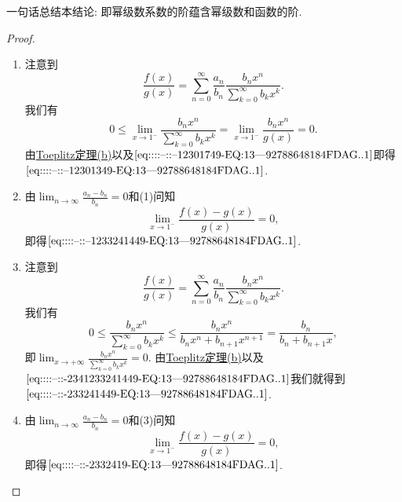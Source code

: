 \documentclass[../../main.tex]{subfiles}
\begin{document}
\begin{remark}
一句话总结本结论: 即幂级数系数的阶蕴含幂级数和函数的阶.
\end{remark}
\begin{proof}
\begin{enumerate}[(1)]
\item 注意到
\[
\frac{f(x)}{g(x)} = \sum_{n=0}^{\infty} \frac{a_n}{b_n} \frac{b_n x^n}{\sum\limits_{k=0}^{\infty} b_k x^k}.
\]
我们有
\[
0 \leqslant \lim_{x \to 1^-} \frac{b_n x^n}{\sum\limits_{k=0}^{\infty} b_k x^k} = \lim_{x \to 1^-} \frac{b_n x^n}{g(x)} = 0.
\]
由\hyperref[theorem:Toeplitz定理]{Toeplitz定理(b)}以及\(\eqref{eq::::--::--12301749-EQ:13---92788648184FDAG..1}\)即得\(\eqref{eq::::--::--12301349-EQ:13---92788648184FDAG..1}\).

\item 由\(\lim_{n \to \infty} \frac{a_n - b_n}{b_n} = 0\)和(1)问知
\[
\lim_{x \to 1^-} \frac{f(x) - g(x)}{g(x)} = 0,
\]
即得\(\eqref{eq::::--::--1233241449-EQ:13---92788648184FDAG..1}\).

\item 注意到
\[
\frac{f(x)}{g(x)} = \sum_{n=0}^{\infty} \frac{a_n}{b_n} \frac{b_n x^n}{\sum\limits_{k=0}^{\infty} b_k x^k}.
\]
我们有
\[
0 \leqslant \frac{b_n x^n}{\sum\limits_{k=0}^{\infty} b_k x^k} \leqslant \frac{b_n x^n}{b_n x^n + b_{n+1} x^{n+1}} = \frac{b_n}{b_n + b_{n+1} x},
\]
即\(\lim_{x \to +\infty} \frac{b_n x^n}{\sum\limits_{k=0}^{\infty} b_k x^k} = 0\). 由\hyperref[theorem:Toeplitz定理]{Toeplitz定理(b)}以及\(\eqref{eq::::--::-2341233241449-EQ:13---92788648184FDAG..1}\)我们就得到\(\eqref{eq::::--::-233241449-EQ:13---92788648184FDAG..1}\).

\item 由\(\lim_{n \to \infty} \frac{a_n - b_n}{b_n} = 0\)和(3)问知
\[
\lim_{x \to 1^-} \frac{f(x) - g(x)}{g(x)} = 0,
\]
即得\(\eqref{eq::::--::-2332419-EQ:13---92788648184FDAG..1}\).
\end{enumerate}

\end{proof}
\end{document}

